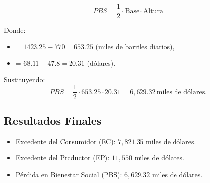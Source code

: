 \documentclass{article}
\begin{document}
\[
PBS = \frac{1}{2} \cdot \text{Base} \cdot \text{Altura}
\]

Donde:
\begin{itemize}
    \item {} = $1423.25 - 770 = 653.25$ (miles de barriles diarios),
    \item {} = $68.11 - 47.8 = 20.31$ (dólares).
\end{itemize}

Sustituyendo:
\[
PBS = \frac{1}{2} \cdot 653.25 \cdot 20.31 = 6,629.32 \, \text{miles de dólares}.
\]

\subsection*{Resultados Finales}
\begin{itemize}
    \item Excedente del Consumidor (EC): $7,821.35$ miles de dólares.
    \item Excedente del Productor (EP): $11,550$ miles de dólares.
    \item Pérdida en Bienestar Social (PBS): $6,629.32$ miles de dólares.
\end{itemize}
\end{document}
